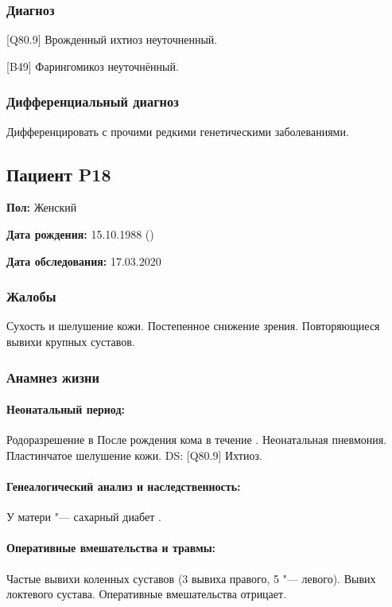 \documentclass[a4paper,14pt]{extarticle}
\newcommand{\months}{мес.}
\newcommand{\DS}[2]{[#2] #1}
\begin{document}
\subsubsection*{Диагноз}

\DS{Врожденный ихтиоз неуточненный}{Q80.9}.

\DS{Фарингомикоз неуточнённый}{B49}.

\subsubsection*{Дифференциальный диагноз}

Дифференцировать с прочими редкими генетическими заболеваниями.

\newpage
\subsection*{Пациент P18}

\textbf{Пол:} Женский

\textbf{Дата рождения:} 15.10.1988 ()

\textbf{Дата обследования:} 17.03.2020

\subsubsection*{Жалобы}

Сухость и шелушение кожи. Постепенное снижение зрения. Повторяющиеся вывихи крупных суставов.

\subsubsection*{Анамнез жизни}

\paragraph{Неонатальный период:} Родоразрешение в \numprint[\months]{7} После рождения кома в течение . Неонатальная пневмония. Пластинчатое шелушение кожи. DS: \DS{Ихтиоз}{Q80.9}.

\paragraph{Генеалогический анализ и наследственность:} У матери "--- сахарный диабет .

\paragraph{Оперативные вмешательства и травмы:} Частые вывихи коленных суставов (3 вывиха правого, 5 "--- левого). Вывих локтевого сустава. Оперативные вмешательства отрицает.
\end{document}

